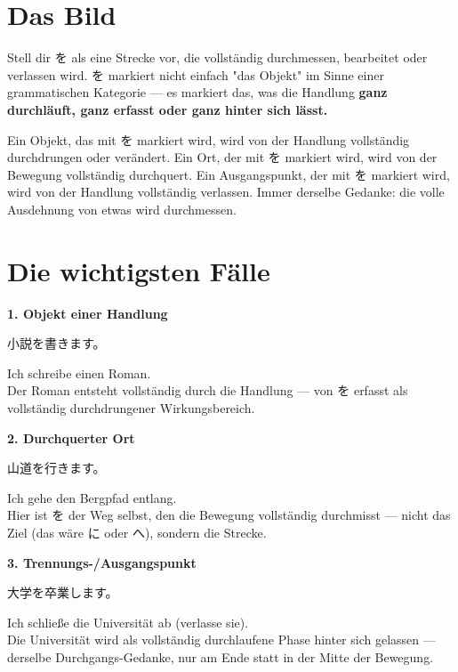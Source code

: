 \documentclass[12pt]{book}
\begin{document}
\section*{Das Bild}

Stell dir を als eine Strecke vor, die vollständig durchmessen, bearbeitet oder verlassen wird. を markiert nicht einfach "das Objekt" im Sinne einer grammatischen Kategorie — es markiert das, was die Handlung \textbf{ganz durchläuft, ganz erfasst oder ganz hinter sich lässt.}

Ein Objekt, das mit を markiert wird, wird von der Handlung vollständig durchdrungen oder verändert. Ein Ort, der mit を markiert wird, wird von der Bewegung vollständig durchquert. Ein Ausgangspunkt, der mit を markiert wird, wird von der Handlung vollständig verlassen. Immer derselbe Gedanke: die volle Ausdehnung von etwas wird durchmessen.

\section*{Die wichtigsten Fälle}

\textbf{1. Objekt einer Handlung}
\par\quad 小説を書きます。\\
\par\quad Ich schreibe einen Roman.\\

Der Roman entsteht vollständig durch die Handlung — von を erfasst als vollständig durchdrungener Wirkungsbereich.

\textbf{2. Durchquerter Ort}
\par\quad 山道を行きます。\\
\par\quad Ich gehe den Bergpfad entlang.\\

Hier ist を der Weg selbst, den die Bewegung vollständig durchmisst — nicht das Ziel (das wäre に oder へ), sondern die Strecke.

\textbf{3. Trennungs-/Ausgangspunkt}
\par\quad 大学を卒業します。\\
\par\quad Ich schließe die Universität ab (verlasse sie).\\

Die Universität wird als vollständig durchlaufene Phase hinter sich gelassen — derselbe Durchgangs-Gedanke, nur am Ende statt in der Mitte der Bewegung.
\end{document}
